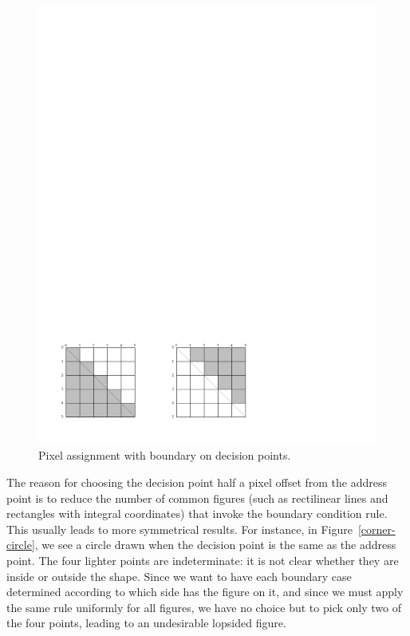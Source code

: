 \begin{figure}
\centerline{\includegraphics{two-triangles}}
\caption{\label{two-triangles} Pixel assignment with boundary on decision points.}
\end{figure}

The reason for choosing the decision point half a pixel offset from the address
point is to reduce the number of common figures (such as rectilinear lines and
rectangles with integral coordinates) that invoke the boundary condition rule.
This usually leads to more symmetrical results.  For instance, in
Figure~\ref{corner-circle}, we see a circle drawn when the decision point is the
same as the address point.  The four lighter points are indeterminate: it is not
clear whether they are inside or outside the shape.  Since we want to have each
boundary case determined according to which side has the figure on it, and since
we must apply the same rule uniformly for all figures, we have no choice but to
pick only two of the four points, leading to an undesirable lopsided figure.

